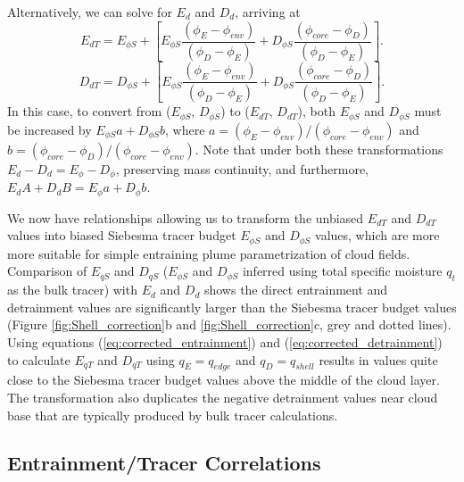 \documentclass[12pt]{article}
\begin{document}
Alternatively, we can solve for $E_d$ and $D_d$, arriving at
\begin{equation}
  \label{eq:corrected_entrainment2}
    E_{d T} = E_{\phi S} 
        + \left[E_{\phi S}\frac{(\phi_E - \phi_{env})}{(\phi_D - \phi_E)} 
              + D_{\phi S}\frac{(\phi_{core} - \phi_D)}{(\phi_D - \phi_E)}\right].
\end{equation}
\begin{equation}
  \label{eq:corrected_detrainment2}
    D_{d T} = D_{\phi S} 
        + \left[E_{\phi S}\frac{(\phi_E - \phi_{env})}{(\phi_D - \phi_E)}
              + D_{\phi S}\frac{(\phi_{core} - \phi_D)}{(\phi_D - \phi_E)}\right].
\end{equation}
In this case, to convert from ($E_{\phi S}$, $D_{\phi S}$) to
($E_{dT}$, $D_{dT}$), both $E_{\phi S}$ and $D_{\phi S}$ must be
increased by $E_{\phi S} a + D_{\phi S} b$, where $a = (\phi_E -
\phi_{env})/(\phi_{core} - \phi_{env})$ and $b = (\phi_{core} -
\phi_D)/(\phi_{core} - \phi_{env})$.  Note that under both these
transformations $E_d-D_d = E_{\phi}-D_{\phi}$, preserving mass
continuity, and furthermore, $E_d A + D_d B = E_{\phi} a + D_{\phi}
b$.

We now have relationships allowing us to transform the unbiased
$E_{dT}$ and $D_{dT}$ values into biased Siebesma tracer budget
$E_{\phi S}$ and $D_{\phi S}$ values, which are more more suitable for
simple entraining plume parametrization of cloud fields.
Comparison of $E_{q S}$ and $D_{q S}$ ($E_{\phi S}$ and $D_{\phi S}$ inferred
using total specific moisture $q_t$ as the bulk tracer) with $E_d$ and $D_d$
shows the direct entrainment and detrainment values are significantly larger 
than the Siebesma tracer budget values (Figure \ref{fig:Shell_correction}b 
and \ref{fig:Shell_correction}c, grey and dotted lines).  
Using equations (\ref{eq:corrected_entrainment}) and 
(\ref{eq:corrected_detrainment}) to calculate $E_{q T}$ and $D_{q T}$ using 
$q_E = q_{edge}$ and $q_D = q_{shell}$ results in values quite close to 
the Siebesma tracer budget values above the middle of the cloud layer.   
The transformation also duplicates the negative 
detrainment values near cloud base that are typically produced by bulk tracer
calculations.


\subsection{Entrainment/Tracer Correlations}
\end{document}
